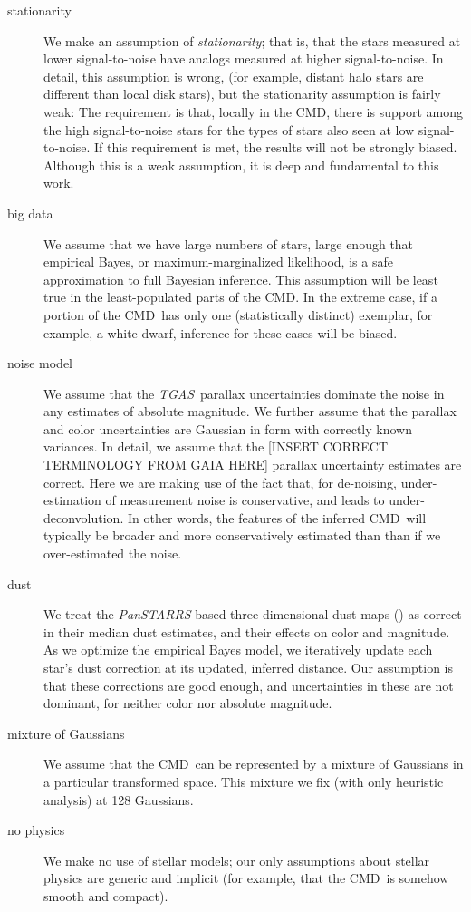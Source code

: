 \documentclass[modern]{aastex61}
\newcommand{\acronym}[1]{{\small{#1}}}
\newcommand{\project}[1]{\textsl{#1}}
\newcommand{\tgas}{\project{\acronym{TGAS}}}
\newcommand{\panstarrs}{\project{Pan\acronym{STARRS}}}
\newcommand{\cmd}{\acronym{CMD}}
\begin{document}
\begin{description}
\item[stationarity] We make an assumption of \emph{stationarity}; that is, that the
  stars measured at lower signal-to-noise have analogs measured at
  higher signal-to-noise.
  In detail, this assumption is wrong, (for example, distant halo stars are different than local
  disk stars), but the stationarity assumption is fairly weak:
  The requirement is that, locally in the \cmd, there is
  support among the high signal-to-noise stars for the types
  of stars also seen at low signal-to-noise.
  If this requirement is met, the results will not be
  strongly biased. Although this is a weak assumption, it is deep and fundamental to this
  work.
\item[big data] We assume that we have large numbers of stars, large enough that
  empirical Bayes, or maximum-marginalized likelihood, is a safe
  approximation to full Bayesian inference. This assumption will be
  least true in the least-populated parts of the \cmd. In the extreme
  case, if a portion of the \cmd\ has only one (statistically distinct)
  exemplar, for example, a white dwarf, inference for these cases will be biased.
\item[noise model] We assume that the \tgas\ parallax uncertainties dominate the
  noise in any estimates of absolute magnitude. We further assume that
  the parallax and color uncertainties are Gaussian in form with
  correctly known variances. In detail, we assume that the [INSERT
    CORRECT TERMINOLOGY FROM GAIA HERE] parallax uncertainty estimates
  are correct. Here we are making use of the fact that, for
  de-noising, under-estimation of measurement noise is conservative, and leads to under-deconvolution. In other words, the features of the inferred \cmd\ will typically be broader and more conservatively estimated than than if we over-estimated the noise.
\item[dust] We treat the \panstarrs-based three-dimensional dust maps (\citealt{green15})
  as correct in their median dust estimates, and their
  effects on color and magnitude. As we optimize the empirical Bayes model, we iteratively update each star's
  dust correction at its updated, inferred distance. Our assumption is that these corrections are
  good enough, and uncertainties in these are not dominant, for neither
  color nor absolute magnitude.
\item[mixture of Gaussians] We assume that the \cmd\ can be represented by a mixture of
  Gaussians in a particular transformed space. This mixture we fix
  (with only heuristic analysis) at 128 Gaussians.
\item[no physics] We make no use of stellar models; our only assumptions about
  stellar physics are generic and implicit (for example, that the
  \cmd\ is somehow smooth and compact).
\end{description}
\end{document}

